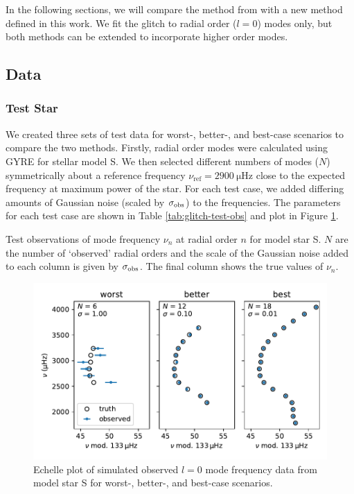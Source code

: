 
In the following sections, we will compare the method from \citet[][hereafter V19]{Verma.Raodeo.ea2019} with a new method defined in this work. We fit the glitch to radial order (\(l = 0\)) modes only, but both methods can be extended to incorporate higher order modes.

\subsection{Data}


\subsubsection{Test Star}

We created three sets of test data for worst-, better-, and best-case scenarios to compare the two methods. Firstly, radial order modes were calculated using \textsc{GYRE} \citep{Townsend.Teitler2013} for stellar model S. We then selected different numbers of modes (\(N\)) symmetrically about a reference frequency \(\nu_\mathrm{ref} = \SI{2900}{\micro\hertz}\) close to the expected frequency at maximum power of the star. For each test case, we added differing amounts of Gaussian noise (scaled by \(\sigma_{{\mathrm{obs}}}\)) to the frequencies. The parameters for each test case are shown in Table \ref{tab:glitch-test-obs} and plot in Figure \ref{fig:glitch-test-obs}.

\begin{table}
    \centering
    \caption{Test observations of mode frequency \(\nu_n\) at radial order \(n\) for model star S. \(N\) are the number of `observed' radial orders and the scale of the Gaussian noise added to each column is given by \(\sigma_{{\mathrm{obs}}}\). The final column shows the true values of \(\nu_n\).}
    \label{tab:glitch-test-obs}
    
\end{table}

\begin{figure}
    \centering
    \includegraphics{figures/glitch-test-obs.pdf}
    \caption{Echelle plot of simulated observed \(l=0\) mode frequency data from model star S for worst-, better-, and best-case scenarios.}
    \label{fig:glitch-test-obs}
\end{figure}

